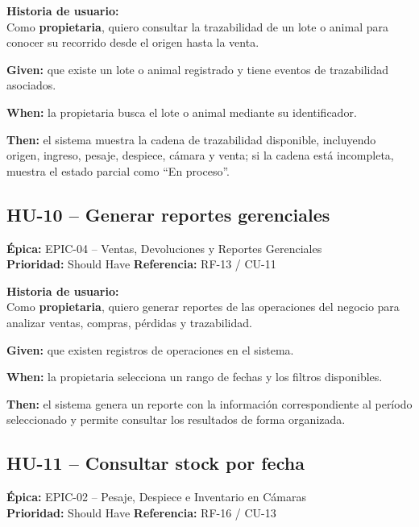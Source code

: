\documentclass[11pt,a4paper]{article}
\begin{document}
\medskip
\textbf{Historia de usuario:}\\
Como \textbf{propietaria}, quiero consultar la trazabilidad de un lote o animal para conocer
su recorrido desde el origen hasta la venta.

\begin{tcolorbox}[colback=lightblue,colframe=uteqblue,title=\textbf{BDD -- Criterio de aceptación}]
\textbf{Given:} que existe un lote o animal registrado y tiene eventos de trazabilidad asociados.

\medskip
\textbf{When:} la propietaria busca el lote o animal mediante su identificador.

\medskip
\textbf{Then:} el sistema muestra la cadena de trazabilidad disponible, incluyendo origen,
ingreso, pesaje, despiece, cámara y venta; si la cadena está incompleta, muestra el estado
parcial como ``En proceso''.
\end{tcolorbox}

\subsection{HU-10 -- Generar reportes gerenciales}
\textbf{Épica:} EPIC-04 -- Ventas, Devoluciones y Reportes Gerenciales\\
\textbf{Prioridad:} Should Have \quad \textbf{Referencia:} RF-13 / CU-11

\medskip
\textbf{Historia de usuario:}\\
Como \textbf{propietaria}, quiero generar reportes de las operaciones del negocio para
analizar ventas, compras, pérdidas y trazabilidad.

\begin{tcolorbox}[colback=lightblue,colframe=uteqblue,title=\textbf{BDD -- Criterio de aceptación}]
\textbf{Given:} que existen registros de operaciones en el sistema.

\medskip
\textbf{When:} la propietaria selecciona un rango de fechas y los filtros disponibles.

\medskip
\textbf{Then:} el sistema genera un reporte con la información correspondiente al período
seleccionado y permite consultar los resultados de forma organizada.
\end{tcolorbox}

\subsection{HU-11 -- Consultar stock por fecha}
\textbf{Épica:} EPIC-02 -- Pesaje, Despiece e Inventario en Cámaras\\
\textbf{Prioridad:} Should Have \quad \textbf{Referencia:} RF-16 / CU-13
\end{document}
